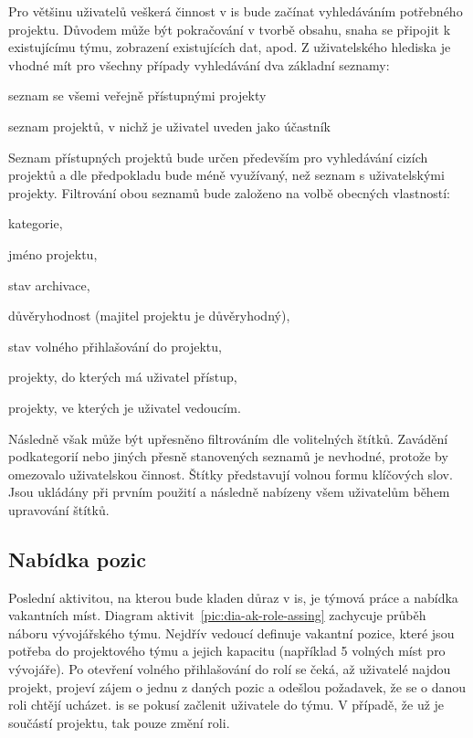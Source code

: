 Pro většinu uživatelů veškerá činnost v \gls{is} bude začínat vyhledáváním potřebného projektu. Důvodem může být pokračování v tvorbě obsahu, snaha se připojit k existujícímu týmu, zobrazení existujících dat, apod. Z uživatelského hlediska je vhodné mít pro všechny případy vyhledávání dva základní seznamy:

\begin{ulnar}
   \item seznam se všemi veřejně přístupnými projekty
   \item seznam projektů, v nichž je uživatel uveden jako účastník
\end{ulnar}

Seznam přístupných projektů bude určen především pro vyhledávání cizích projektů a dle předpokladu bude méně využívaný, než seznam s uživatelskými projekty. Filtrování obou seznamů bude založeno na volbě obecných vlastností:

\begin{ulnar}
   \item kategorie,
   \item jméno projektu,
   \item stav archivace,
   \item důvěryhodnost (majitel projektu je důvěryhodný),
   \item stav volného přihlašování do projektu,
   \item projekty, do kterých má uživatel přístup,
   \item projekty, ve kterých je uživatel vedoucím.
\end{ulnar}

Následně však může být upřesněno filtrováním dle volitelných štítků. Zavádění podkategorií nebo jiných přesně stanovených seznamů je nevhodné, protože by omezovalo uživatelskou činnost. Štítky představují volnou formu klíčových slov. Jsou ukládány při prvním použití a následně nabízeny všem uživatelům během upravování štítků.





\subsection{Nabídka pozic}

Poslední aktivitou, na kterou bude kladen důraz v \gls{is}, je týmová práce a nabídka vakantních míst. Diagram aktivit~\ref{pic:dia-ak-role-assing} zachycuje průběh náboru vývojářského týmu. Nejdřív vedoucí definuje vakantní pozice, které jsou potřeba do projektového týmu a jejich kapacitu (například 5 volných míst pro vývojáře). Po otevření volného přihlašování do rolí se čeká, až uživatelé najdou projekt, projeví zájem o jednu z daných pozic a odešlou požadavek, že se o danou roli chtějí ucházet. \gls{is} se pokusí začlenit uživatele do týmu. V případě, že už je součástí projektu, tak pouze změní roli.


